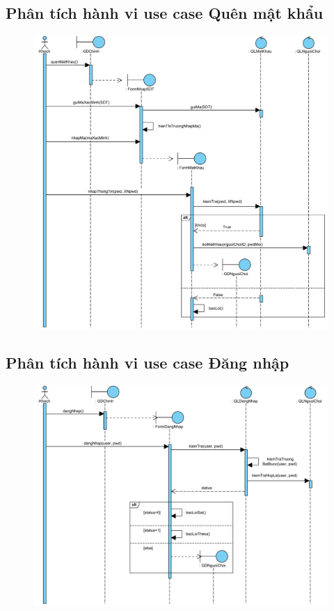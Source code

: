 \documentclass[3p]{elsarticle}
\begin{document}
\subsection{Phân tích hành vi use case Quên mật khẩu}
\begin{figure}[!htbp]
	\hspace*{-.5in}
	\centering
	\includegraphics[scale=.55]{images/sequence-pdfs/guest/forgetPass.pdf}
\end{figure}
\newpage
\subsection{Phân tích hành vi use case Đăng nhập}
\begin{figure}[!htbp]
	\hspace*{-.5in}
	\centering
	\includegraphics[scale=.55]{images/sequence-pdfs/guest/Login.pdf}
\end{figure}
\newpage
\end{document}
